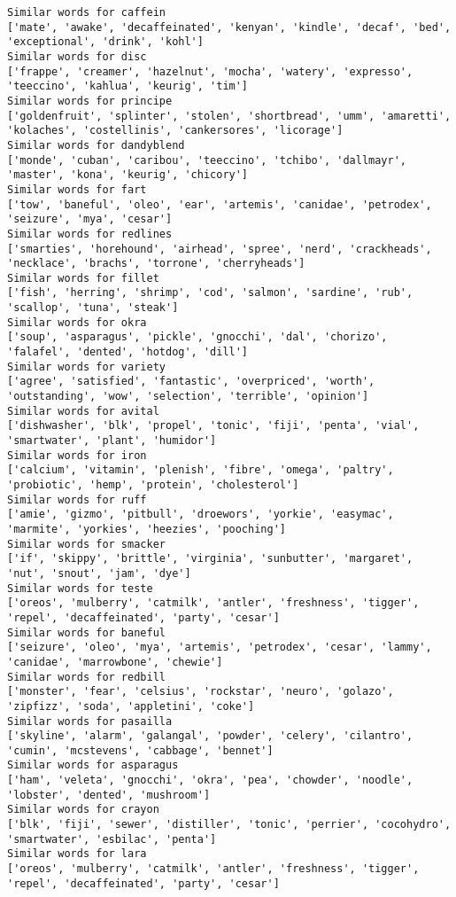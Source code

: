 \documentclass[11pt]{article}
\begin{document}
\begin{Verbatim}[commandchars=\\\{\}]
Similar words for caffein
['mate', 'awake', 'decaffeinated', 'kenyan', 'kindle', 'decaf', 'bed', 'exceptional', 'drink', 'kohl']
Similar words for disc
['frappe', 'creamer', 'hazelnut', 'mocha', 'watery', 'expresso', 'teeccino', 'kahlua', 'keurig', 'tim']
Similar words for principe
['goldenfruit', 'splinter', 'stolen', 'shortbread', 'umm', 'amaretti', 'kolaches', 'costellinis', 'cankersores', 'licorage']
Similar words for dandyblend
['monde', 'cuban', 'caribou', 'teeccino', 'tchibo', 'dallmayr', 'master', 'kona', 'keurig', 'chicory']
Similar words for fart
['tow', 'baneful', 'oleo', 'ear', 'artemis', 'canidae', 'petrodex', 'seizure', 'mya', 'cesar']
Similar words for redlines
['smarties', 'horehound', 'airhead', 'spree', 'nerd', 'crackheads', 'necklace', 'brachs', 'torrone', 'cherryheads']
Similar words for fillet
['fish', 'herring', 'shrimp', 'cod', 'salmon', 'sardine', 'rub', 'scallop', 'tuna', 'steak']
Similar words for okra
['soup', 'asparagus', 'pickle', 'gnocchi', 'dal', 'chorizo', 'falafel', 'dented', 'hotdog', 'dill']
Similar words for variety
['agree', 'satisfied', 'fantastic', 'overpriced', 'worth', 'outstanding', 'wow', 'selection', 'terrible', 'opinion']
Similar words for avital
['dishwasher', 'blk', 'propel', 'tonic', 'fiji', 'penta', 'vial', 'smartwater', 'plant', 'humidor']
Similar words for iron
['calcium', 'vitamin', 'plenish', 'fibre', 'omega', 'paltry', 'probiotic', 'hemp', 'protein', 'cholesterol']
Similar words for ruff
['amie', 'gizmo', 'pitbull', 'droewors', 'yorkie', 'easymac', 'marmite', 'yorkies', 'heezies', 'pooching']
Similar words for smacker
['if', 'skippy', 'brittle', 'virginia', 'sunbutter', 'margaret', 'nut', 'snout', 'jam', 'dye']
Similar words for teste
['oreos', 'mulberry', 'catmilk', 'antler', 'freshness', 'tigger', 'repel', 'decaffeinated', 'party', 'cesar']
Similar words for baneful
['seizure', 'oleo', 'mya', 'artemis', 'petrodex', 'cesar', 'lammy', 'canidae', 'marrowbone', 'chewie']
Similar words for redbill
['monster', 'fear', 'celsius', 'rockstar', 'neuro', 'golazo', 'zipfizz', 'soda', 'appletini', 'coke']
Similar words for pasailla
['skyline', 'alarm', 'galangal', 'powder', 'celery', 'cilantro', 'cumin', 'mcstevens', 'cabbage', 'bennet']
Similar words for asparagus
['ham', 'veleta', 'gnocchi', 'okra', 'pea', 'chowder', 'noodle', 'lobster', 'dented', 'mushroom']
Similar words for crayon
['blk', 'fiji', 'sewer', 'distiller', 'tonic', 'perrier', 'cocohydro', 'smartwater', 'esbilac', 'penta']
Similar words for lara
['oreos', 'mulberry', 'catmilk', 'antler', 'freshness', 'tigger', 'repel', 'decaffeinated', 'party', 'cesar']

\end{Verbatim}
\end{document}
